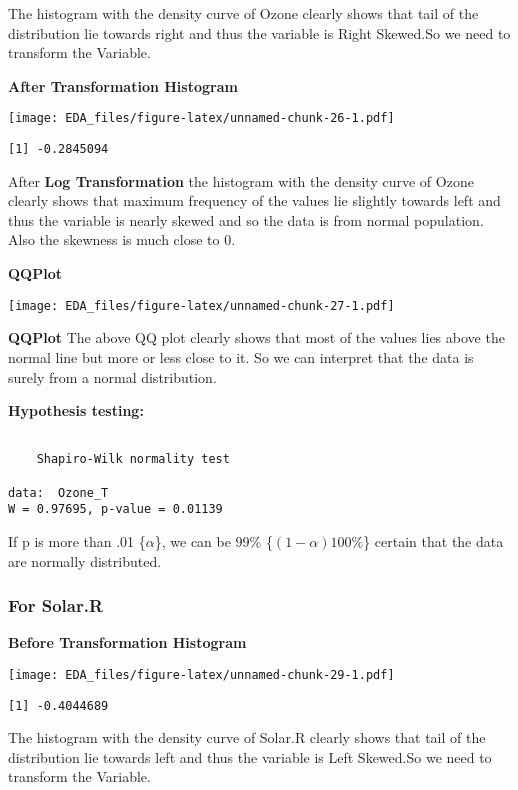 \documentclass[12pt,]{article}
\begin{document}
The histogram with the density curve of Ozone clearly shows that tail of
the distribution lie towards right and thus the variable is Right
Skewed.So we need to transform the Variable.

\textbf{After Transformation Histogram}

\texttt{[image: EDA\_files/figure-latex/unnamed-chunk-26-1.pdf]}

\begin{verbatim}
[1] -0.2845094
\end{verbatim}

After \textbf{Log Transformation} the histogram with the density curve
of Ozone clearly shows that maximum frequency of the values lie slightly
towards left and thus the variable is nearly skewed and so the data is
from normal population. Also the skewness is much close to 0.

\textbf{QQPlot}

\texttt{[image: EDA\_files/figure-latex/unnamed-chunk-27-1.pdf]}

\textbf{QQPlot} The above QQ plot clearly shows that most of the values
lies above the normal line but more or less close to it. So we can
interpret that the data is surely from a normal distribution.

\textbf{Hypothesis testing:}

\begin{verbatim}

    Shapiro-Wilk normality test

data:  Ozone_T
W = 0.97695, p-value = 0.01139
\end{verbatim}

If p is more than .01 \{\(\alpha\)\}, we can be 99\%
\{\((1-\alpha)100\%\)\} certain that the data are normally distributed.

\subsubsection{\texorpdfstring{\textbf{For
Solar.R}}{For Solar.R}}\label{for-solar.r}

\textbf{Before Transformation Histogram}

\texttt{[image: EDA\_files/figure-latex/unnamed-chunk-29-1.pdf]}

\begin{verbatim}
[1] -0.4044689
\end{verbatim}

The histogram with the density curve of Solar.R clearly shows that tail
of the distribution lie towards left and thus the variable is Left
Skewed.So we need to transform the Variable.
\end{document}
